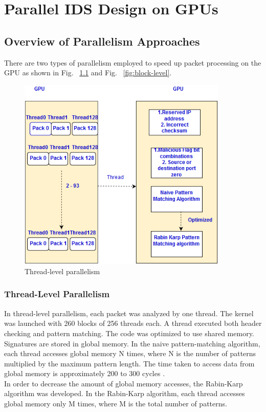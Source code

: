 \chapter{Parallel IDS Design on GPUs}
\vspace{\topsep} 
\section{Overview of Parallelism Approaches}
There are two types of parallelism employed to speed up packet processing on the GPU as shown in Fig. ~\ref{fig:thread-level} and Fig. ~\ref{fig:block-level}.
\begin{figure}[H]
	\centering
	\includegraphics[width=10cm]{threadlevel.png}
	\caption{Thread-level parallelism}
	\label{fig:thread-level}
\end{figure}
\squeezeup
\subsection{Thread-Level Parallelism}
In thread-level parallelism, each packet was analyzed by one thread. The kernel was launched with 260 blocks of 256 threads each. A thread executed both header checking and pattern matching. The code was optimized to use shared memory. Signatures are stored in global memory. In the naive pattern-matching algorithm, each thread accesses global memory N times, where N is the number of patterns multiplied by the maximum pattern length. The time taken to access data from global memory is approximately 200 to 300 cycles \cite{bib14}. \\ In order to decrease the amount of global memory accesses, the Rabin-Karp algorithm was developed. In the Rabin-Karp algorithm, each thread accesses global memory only M times, where M is the total number of patterns. 
